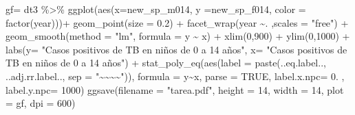 \documentclass[
]{article}
\newenvironment{Shaded}{\begin{snugshade}}{\end{snugshade}}
\newcommand{\AttributeTok}[1]{\textcolor[rgb]{0.77,0.63,0.00}{#1}}
\newcommand{\ConstantTok}[1]{\textcolor[rgb]{0.00,0.00,0.00}{#1}}
\newcommand{\DecValTok}[1]{\textcolor[rgb]{0.00,0.00,0.81}{#1}}
\newcommand{\FloatTok}[1]{\textcolor[rgb]{0.00,0.00,0.81}{#1}}
\newcommand{\FunctionTok}[1]{\textcolor[rgb]{0.00,0.00,0.00}{#1}}
\newcommand{\NormalTok}[1]{#1}
\newcommand{\OtherTok}[1]{\textcolor[rgb]{0.56,0.35,0.01}{#1}}
\newcommand{\SpecialCharTok}[1]{\textcolor[rgb]{0.00,0.00,0.00}{#1}}
\newcommand{\StringTok}[1]{\textcolor[rgb]{0.31,0.60,0.02}{#1}}
\begin{document}
\begin{Shaded}
\begin{Highlighting}[]
\NormalTok{gf}\OtherTok{=}\NormalTok{ dt3 }\SpecialCharTok{\%\textgreater{}\%} \FunctionTok{ggplot}\NormalTok{(}\FunctionTok{aes}\NormalTok{(}\AttributeTok{x=}\NormalTok{new\_sp\_m014, }\AttributeTok{y =}\NormalTok{new\_sp\_f014, }\AttributeTok{color =} \FunctionTok{factor}\NormalTok{(year)))}\SpecialCharTok{+} \FunctionTok{geom\_point}\NormalTok{(}\AttributeTok{size =} \FloatTok{0.2}\NormalTok{) }\SpecialCharTok{+} \FunctionTok{facet\_wrap}\NormalTok{(year }\SpecialCharTok{\textasciitilde{}}\NormalTok{. ,}\AttributeTok{scales =} \StringTok{"free"}\NormalTok{) }\SpecialCharTok{+} \FunctionTok{geom\_smooth}\NormalTok{(}\AttributeTok{method =} \StringTok{"lm"}\NormalTok{, }\AttributeTok{formula =}\NormalTok{ y }\SpecialCharTok{\textasciitilde{}}\NormalTok{ x) }\SpecialCharTok{+} \FunctionTok{xlim}\NormalTok{(}\DecValTok{0}\NormalTok{,}\DecValTok{900}\NormalTok{) }\SpecialCharTok{+} \FunctionTok{ylim}\NormalTok{(}\DecValTok{0}\NormalTok{,}\DecValTok{1000}\NormalTok{) }\SpecialCharTok{+} \FunctionTok{labs}\NormalTok{(}\AttributeTok{y=} \StringTok{"Casos positivos de TB en niños de 0 a 14 años"}\NormalTok{, }\AttributeTok{x=} \StringTok{"Casos positivos de TB en niños de 0 a 14 años"}\NormalTok{) }\SpecialCharTok{+} \FunctionTok{stat\_poly\_eq}\NormalTok{(}\FunctionTok{aes}\NormalTok{(}\AttributeTok{label =}  \FunctionTok{paste}\NormalTok{(..eq.label.., ..adj.rr.label.., }\AttributeTok{sep =} \StringTok{"\textasciitilde{}\textasciitilde{}\textasciitilde{}\textasciitilde{}"}\NormalTok{)),}
                                                                                                                                                                                                                                                                                                                                                     \AttributeTok{formula =}\NormalTok{ y}\SpecialCharTok{\textasciitilde{}}\NormalTok{x, }\AttributeTok{parse =} \ConstantTok{TRUE}\NormalTok{, }\AttributeTok{label.x.npc=} \FloatTok{0.}\NormalTok{ , }\AttributeTok{label.y.npc=} \DecValTok{1000}\NormalTok{)}
\FunctionTok{ggsave}\NormalTok{(}\AttributeTok{filename =} \StringTok{"tarea.pdf"}\NormalTok{, }\AttributeTok{height =} \DecValTok{14}\NormalTok{, }\AttributeTok{width =} \DecValTok{14}\NormalTok{, }
       \AttributeTok{plot =}\NormalTok{ gf, }\AttributeTok{dpi =} \DecValTok{600}\NormalTok{)}
\end{Highlighting}
\end{Shaded}
\end{document}
